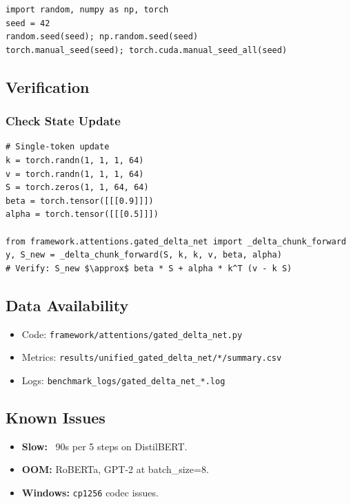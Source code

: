 \begin{lstlisting}
import random, numpy as np, torch
seed = 42
random.seed(seed); np.random.seed(seed)
torch.manual_seed(seed); torch.cuda.manual_seed_all(seed)
\end{lstlisting}

\subsection{Verification}

\subsubsection{Check State Update}

\begin{lstlisting}
# Single-token update
k = torch.randn(1, 1, 1, 64)
v = torch.randn(1, 1, 1, 64)
S = torch.zeros(1, 1, 64, 64)
beta = torch.tensor([[[0.9]]])
alpha = torch.tensor([[[0.5]]])

from framework.attentions.gated_delta_net import _delta_chunk_forward
y, S_new = _delta_chunk_forward(S, k, k, v, beta, alpha)
# Verify: S_new $\approx$ beta * S + alpha * k^T (v - k S)
\end{lstlisting}

\subsection{Data Availability}

\begin{itemize}
\item Code: \texttt{framework/attentions/gated\_delta\_net.py}
\item Metrics: \texttt{results/unified\_gated\_delta\_net/*/summary.csv}
\item Logs: \texttt{benchmark\_logs/gated\_delta\_net\_*.log}

\end{itemize}
\subsection{Known Issues}

\begin{itemize}
\item \textbf{Slow:} ~90s per 5 steps on DistilBERT.
\item \textbf{OOM:} RoBERTa, GPT-2 at batch\_size=8.
\item \textbf{Windows:} \texttt{cp1256} codec issues.

\end{itemize}
